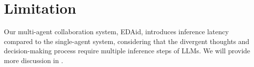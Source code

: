 \section*{Limitation}
Our multi-agent collaboration system, EDAid, introduces inference latency compared to the single-agent system, considering that the divergent thoughts and decision-making process require multiple inference steps of LLMs.
We will provide more discussion in .
